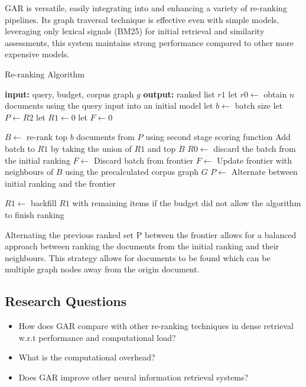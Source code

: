 \documentclass[sigconf,authorversion,nonacm]{acmart}
\begin{document}
GAR is versatile, easily integrating into and enhancing a variety of re-ranking pipelines. Its graph
traversal technique is effective even with simple models, leveraging only lexical signals (BM25) for
initial retrieval and similarity assessments, this system maintains strong performance
compared to other more expensive models.

\begin{algorithm}
	\caption{Re-ranking Algorithm}
	\begin{algorithmic}[1]
		\STATE \textbf{input:} query, budget, corpus graph \(g\)
		\STATE \textbf{output:} ranked list \(r1\)
		\STATE let \(r0 \leftarrow\) obtain \(n\) documents using the query input into an initial model
		\STATE let \(b \leftarrow\) batch size
		\STATE let \(P \leftarrow R2 \)
		\STATE let \(R1 \leftarrow 0 \)
		\STATE let \(F \leftarrow 0 \)

		\STATE \(B \leftarrow\) re-rank top \(b\) documents from \(P\) using second stage scoring function
		\STATE Add batch to \(R1\) by taking the union of \(R1\) and top \(B\)
		\STATE \(R0 \leftarrow\) discard the batch from the initial ranking
		\STATE \(F \leftarrow\) Discard batch from frontier
		\STATE \(F \leftarrow\) Update frontier with neighbours of \(B\) using the precalculated corpus graph \(G\)
		\STATE \(P \leftarrow\) Alternate between initial ranking and the frontier
		\ENDWHILE

		\STATE \(R1 \leftarrow\) backfill \(R1\) with remaining items if the budget did not allow the algorithm to finish ranking
	\end{algorithmic}
\end{algorithm}

Alternating the previous ranked set P between the frontier allows for a balanced approach between
ranking the documents from the initial ranking and their neighbours. This strategy allows for
documents to be found which can be multiple graph nodes away from the origin document.

\subsection{Research Questions}

\begin{itemize}

	\item How does GAR compare with other re-ranking techniques in dense retrieval w.r.t
	      performance and computational load?

	\item What is the computational overhead?

	\item Does GAR improve other neural information retrieval systems?

\end{itemize}
\end{document}
